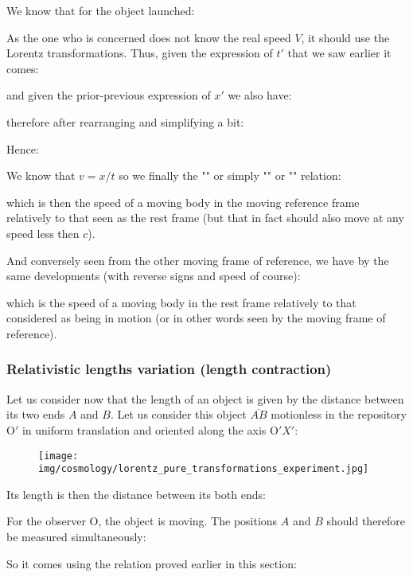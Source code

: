 	We know that for the object launched:
	
	As the one who is concerned does not know the real speed $V$, it should use the Lorentz transformations. Thus, given the expression of $t'$ that we saw earlier it comes:
	
	and given the prior-previous expression of $x'$ we also have:
	
	therefore after rearranging and simplifying a bit:
	
	Hence:
	
	We know that $v=x/t$ so we finally the "" or simply "" or "" relation:
	
	which is then the speed of a moving body in the moving reference frame relatively to that seen as the rest frame (but that in fact should also move at any speed less then $c$).

	And conversely seen from the other moving frame of reference, we have by the same developments (with reverse signs and speed of course):
	
	which is the speed of a moving body in the rest frame relatively to that considered as being in motion (or in other words seen by the moving frame of reference).
	
	\subsubsection{Relativistic lengths variation (length contraction)}
	Let us consider now that the length of an object is given by the distance between its two ends $A$ and $B$. Let us consider this object $\overline{AB}$ motionless in the repository $\text{O}'$ in uniform translation and oriented along the axis $\text{O}'X'$:
	\begin{figure}[H]
		\begin{center}
		\texttt{[image: img/cosmology/lorentz\_pure\_transformations\_experiment.jpg]}
		\end{center}	
	\end{figure}
	Its length is then the distance between its both ends:
	
	For the observer O, the object is moving. The positions $A$ and $B$ should therefore be measured simultaneously:
	
	So it comes using the relation proved earlier in this section:
	
